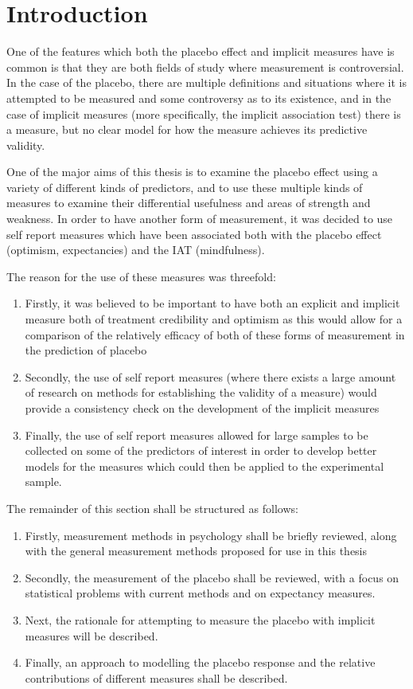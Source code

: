 \section{Introduction}
\label{sec:introduction}

One of the features which both the placebo effect and implicit measures have is common is that they are both fields of study where measurement is controversial. In the case of the placebo, there are multiple definitions and situations where it is attempted to be measured and some controversy as to its existence, and in the case of implicit measures (more specifically, the implicit association test) there is a measure, but no clear model for how the measure achieves its predictive validity. 

One of the major aims of this thesis is to examine the placebo effect using a variety of different kinds of predictors, and to use these multiple kinds of measures to examine their differential usefulness and areas of strength and weakness. In order to have another form of measurement, it was decided to use self report measures which have been associated both with the placebo effect (optimism, expectancies) and the IAT (mindfulness). 

The reason for the use of these measures was threefold:
\begin{enumerate}
\item Firstly, it was believed to be important to have both an explicit and implicit measure both of treatment credibility and optimism as this would allow for a comparison of the relatively efficacy of both of these forms of measurement in the prediction of placebo
\item Secondly, the use of self report measures (where there exists a large amount of  research on methods for establishing the validity of a measure) would provide a consistency check on the development of the implicit measures
\item Finally, the use of self report measures allowed for large samples to be collected on some of the predictors of interest in order to develop better models for the measures which could then be applied to the experimental sample. 
\end{enumerate}

The remainder of this section shall be structured as follows:
\begin{enumerate}
\item Firstly, measurement methods in psychology shall be briefly reviewed, along with the general measurement methods proposed for use in this thesis 
\item Secondly, the measurement of the placebo shall be reviewed, with a focus on statistical problems with current methods and on expectancy measures.
\item Next, the rationale for attempting to measure the placebo with implicit measures will be described. 
\item Finally, an approach to modelling the placebo response and the relative contributions of different measures shall be described. 
\end{enumerate}


